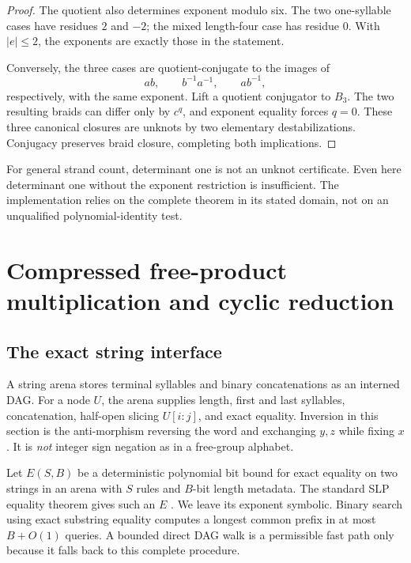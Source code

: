 \documentclass[11pt,letterpaper]{article}
\theoremstyle{definition}\newtheorem{definition}[theorem]{Definition}
\theoremstyle{remark}\newtheorem{remark}[theorem]{Remark}
\begin{document}
\begin{proof}
The quotient also determines exponent modulo six. The two one-syllable cases have residues $2$ and $-2$; the mixed length-four case has residue $0$. With $|e|\le2$, the exponents are exactly those in the statement.

Conversely, the three cases are quotient-conjugate to the images of
\[
 ab,\qquad b^{-1}a^{-1},\qquad ab^{-1},
\]
respectively, with the same exponent. Lift a quotient conjugator to $B_3$. The two resulting braids can differ only by $c^q$, and exponent equality forces $q=0$. These three canonical closures are unknots by two elementary destabilizations. Conjugacy preserves braid closure, completing both implications.
\end{proof}

For general strand count, determinant one is not an unknot certificate. Even here determinant one without the exponent restriction is insufficient. The implementation relies on the complete theorem in its stated domain, not on an unqualified polynomial-identity test.

\section{Compressed free-product multiplication and cyclic reduction}
\subsection{The exact string interface}
A string arena stores terminal syllables and binary concatenations as an interned DAG. For a node $U$, the arena supplies length, first and last syllables, concatenation, half-open slicing $U[i:j]$, and exact equality. Inversion in this section is the anti-morphism reversing the word and exchanging $y,z$ while fixing $x$. It is \emph{not} integer sign negation as in a free-group alphabet.

Let $E(S,B)$ be a deterministic polynomial bit bound for exact equality on two strings in an arena with $S$ rules and $B$-bit length metadata. The standard SLP equality theorem gives such an $E$ \cite{schleimer}. We leave its exponent symbolic. Binary search using exact substring equality computes a longest common prefix in at most $B+O(1)$ queries. A bounded direct DAG walk is a permissible fast path only because it falls back to this complete procedure.
\end{document}
